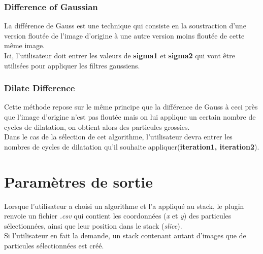 \documentclass[11pt,a4paper]{report}
\begin{document}
\subsubsection{Difference of Gaussian}
La différence de Gauss est une technique qui consiste en la soustraction d'une version floutée de l'image d'origine à une autre version moins floutée de cette même image.\\
Ici, l'utilisateur doit entrer les valeurs de \textbf{sigma1} et \textbf{sigma2} qui vont être  utilisées pour appliquer les filtres gaussiens.

\subsubsection{Dilate Difference}
Cette méthode repose sur le même principe que la différence de Gauss à ceci près que l'image d'origine n'est pas floutée mais on lui applique un certain nombre de cycles de dilatation, on obtient alors des particules grossies.\\
Dans le cas de la sélection de cet algorithme, l'utilisateur devra entrer les  nombres de cycles de dilatation qu'il souhaite appliquer(\textbf{iteration1, iteration2}).

\section{Paramètres de sortie}
Lorsque l'utilisateur a choisi un algorithme et l'a appliqué au stack, le plugin renvoie un fichier \emph{.csv} qui contient les coordonnées (\emph{x} et \emph{y}) des particules  sélectionnées, ainsi que leur position dans le stack (\emph{slice}).\\
Si l'utilisateur en fait la demande, un stack contenant autant d'images que de particules sélectionnées est créé. 
\end{document}
